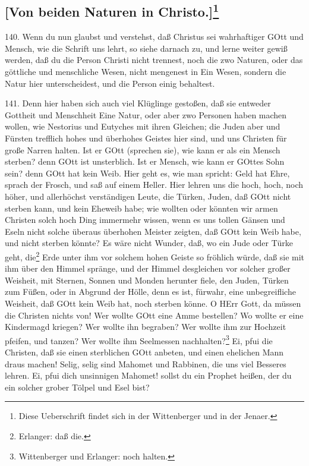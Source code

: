 \subsection[Von beiden Naturen in Christo]{[Von beiden Naturen in Christo.]\footnote{Diese Ueberschrift findet sich in der Wittenberger und in der Jenaer.}}

140. Wenn du nun glaubst und verstehst, daß Christus sei wahrhaftiger GOtt und Mensch, wie die Schrift uns lehrt, so siehe darnach zu, und lerne weiter gewiß werden, daß du die Person Christi nicht trennest, noch die zwo Naturen, oder das göttliche und menschliche Wesen, nicht mengenest in Ein Wesen, sondern die Natur hier unterscheidest, und die Person einig behaltest.

141. Denn hier haben sich auch viel Klüglinge gestoßen, daß sie entweder Gottheit und Menschheit Eine Natur, oder aber zwo Personen haben machen wollen, wie Nestorius und Eutyches mit ihren Gleichen; die Juden aber
und Fürsten trefflich hohes und überhohes Geistes hier sind, und uns Christen für große Narren halten. Ist er GOtt (sprechen sie), wie kann er als ein Mensch sterben? denn GOtt ist unsterblich. Ist er Mensch, wie kann er GOttes Sohn sein? denn GOtt hat kein Weib. Hier geht es, wie man spricht: Geld hat Ehre, sprach der Frosch, und saß auf einem Heller. Hier lehren uns die hoch, hoch, noch höher, und allerhöchst verständigen Leute, die Türken, Juden, daß GOtt nicht sterben kann, und kein Eheweib habe; wie wollten oder könnten wir armen Christen solch hoch Ding immermehr wissen, wenn es uns tollen Gänsen und Eseln nicht solche überaus überhohen Meister zeigten, daß GOtt kein Weib habe, und nicht sterben könnte? Es wäre nicht Wunder, daß, wo ein Jude oder Türke geht, die\footnote{Erlanger: daß die.} Erde unter ihm vor solchem hohen Geiste so fröhlich würde, daß sie mit ihm über den Himmel spränge, und der Himmel desgleichen vor solcher großer Weisheit, mit Sternen, Sonnen und Monden herunter fiele, den Juden, Türken zum Füßen, oder in Abgrund der Hölle, denn es ist, fürwahr, eine unbegreifliche Weisheit, daß GOtt kein Weib hat, noch sterben könne. O HErr Gott, da müssen die Christen nichts von! Wer wollte GOtt eine Amme bestellen? Wo wollte er eine Kindermagd kriegen? Wer wollte ihn begraben? Wer wollte ihm zur Hochzeit pfeifen, und tanzen? Wer wollte ihm Seelmessen nachhalten?\footnote{Wittenberger und Erlanger: noch halten.} Ei, pfui die Christen, daß sie einen sterblichen GOtt anbeten, und einen ehelichen Mann draus machen! Selig, selig sind Mahomet und Rabbinen, die uns viel Besseres lehren. Ei, pfui dich unsinnigen Mahomet! sollst du ein Prophet heißen, der du ein solcher grober Tölpel und Esel bist?

